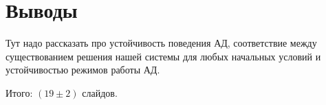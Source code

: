 \section{Выводы}

Тут надо рассказать про устойчивость поведения АД, соответствие между существованием решения нашей системы для любых начальных условий и устойчивостью режимов работы АД. 

\vspace{4mm}
\begin{center}
Итого: $ ( 19 \pm 2 ) $ слайдов.
\end{center}
